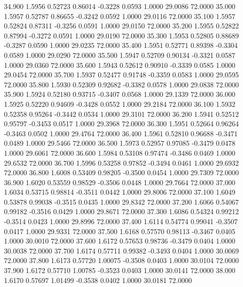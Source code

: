   34.900   1.5956   0.52723   0.86014  -0.3228   0.0593   1.0000  29.0086  72.0000
  35.000   1.5957   0.52787   0.86655  -0.3242   0.0592   1.0000  29.0116  72.0000
  35.100   1.5957   0.52824   0.87311  -0.3256   0.0591   1.0000  29.0150  72.0000
  35.200   1.5955   0.52822   0.87994  -0.3272   0.0591   1.0000  29.0190  72.0000
  35.300   1.5953   0.52805   0.88689  -0.3287   0.0590   1.0000  29.0235  72.0000
  35.400   1.5951   0.52771   0.89398  -0.3304   0.0589   1.0000  29.0290  72.0000
  35.500   1.5947   0.52709   0.90134  -0.3321   0.0587   1.0000  29.0360  72.0000
  35.600   1.5943   0.52612   0.90910  -0.3339   0.0585   1.0000  29.0454  72.0000
  35.700   1.5937   0.52477   0.91748  -0.3359   0.0583   1.0000  29.0595  72.0000
  35.800   1.5930   0.52309   0.92682  -0.3382   0.0578   1.0000  29.0838  72.0000
  35.900   1.5924   0.52180   0.93715  -0.3407   0.0568   1.0000  29.1339  72.0000
  36.000   1.5925   0.52220   0.94609  -0.3428   0.0552   1.0000  29.2184  72.0000
  36.100   1.5932   0.52358   0.95264  -0.3442   0.0534   1.0000  29.3101  72.0000
  36.200   1.5941   0.52512   0.95797  -0.3453   0.0517   1.0000  29.3968  72.0000
  36.300   1.5951   0.52664   0.96264  -0.3463   0.0502   1.0000  29.4764  72.0000
  36.400   1.5961   0.52810   0.96688  -0.3471   0.0489   1.0000  29.5466  72.0000
  36.500   1.5973   0.52957   0.97085  -0.3479   0.0478   1.0000  29.6061  72.0000
  36.600   1.5984   0.53108   0.97474  -0.3486   0.0469   1.0000  29.6532  72.0000
  36.700   1.5996   0.53258   0.97852  -0.3494   0.0461   1.0000  29.6932  72.0000
  36.800   1.6008   0.53409   0.98205  -0.3500   0.0454   1.0000  29.7309  72.0000
  36.900   1.6020   0.53559   0.98529  -0.3506   0.0448   1.0000  29.7664  72.0000
  37.000   1.6034   0.53715   0.98814  -0.3511   0.0442   1.0000  29.8006  72.0000
  37.100   1.6049   0.53878   0.99038  -0.3515   0.0435   1.0000  29.8342  72.0000
  37.200   1.6066   0.54067   0.99182  -0.3516   0.0429   1.0000  29.8671  72.0000
  37.300   1.6086   0.54324   0.99212  -0.3514   0.0423   1.0000  29.8996  72.0000
  37.400   1.6114   0.54774   0.99041  -0.3507   0.0417   1.0000  29.9331  72.0000
  37.500   1.6168   0.57570   0.98113  -0.3467   0.0405   1.0000  30.0010  72.0000
  37.600   1.6172   0.57653   0.98736  -0.3479   0.0404   1.0000  30.0038  72.0000
  37.700   1.6174   0.57711   0.99382  -0.3493   0.0404   1.0000  30.0069  72.0000
  37.800   1.6173   0.57720   1.00075  -0.3508   0.0403   1.0000  30.0104  72.0000
  37.900   1.6172   0.57710   1.00785  -0.3523   0.0403   1.0000  30.0141  72.0000
  38.000   1.6170   0.57697   1.01499  -0.3538   0.0402   1.0000  30.0181  72.0000
